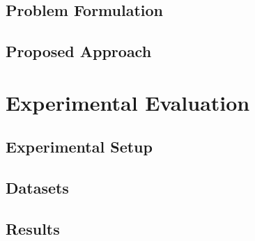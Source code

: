 \documentclass[11pt,a4paper]{article}
\begin{document}

\subsection{Problem Formulation}
\label{subsec:formulation}


\subsection{Proposed Approach}
\label{subsec:approach}


\section{Experimental Evaluation}
\label{sec:experiments}


\subsection{Experimental Setup}
\label{subsec:setup}


\subsection{Datasets}
\label{subsec:datasets}

\subsection{Results}
\label{subsec:results}

\end{document}
